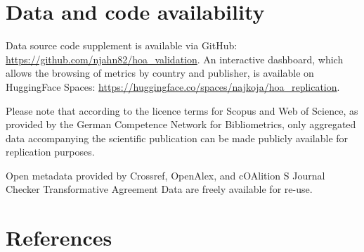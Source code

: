\documentclass[a4paper,man,floatsintext,longtable,noextraspace,10pt]{apa6}
\begin{document}
\section*{Data and code availability}\label{data-and-code-availability}

Data source code supplement is available via GitHub:
\url{https://github.com/njahn82/hoa_validation}. An interactive
dashboard, which allows the browsing of metrics by country and
publisher, is available on HuggingFace Spaces:
\url{https://huggingface.co/spaces/najkoja/hoa_replication}.

Please note that according to the licence terms for Scopus and Web of
Science, as provided by the German Competence Network for Bibliometrics,
only aggregated data accompanying the scientific publication can be made
publicly available for replication purposes.

Open metadata provided by Crossref, OpenAlex, and cOAlition S Journal
Checker Transformative Agreement Data are freely available for re-use.

\section*{References}\label{references}
\end{document}
